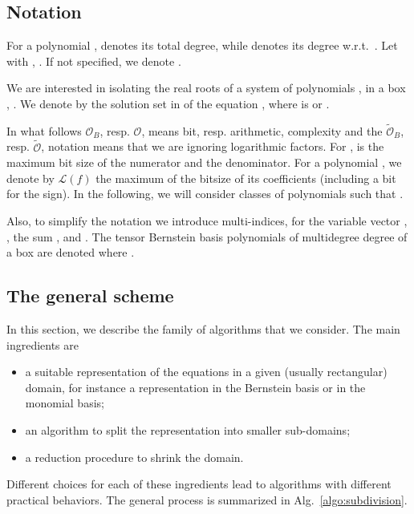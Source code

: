 \documentclass{sig-alternate}
\newcommand{\OO}{\ensuremath{\mathcal{O}}\xspace}
\newcommand{\sO}{\ensuremath{\widetilde{\mathcal{O}}}\xspace}
\newcommand{\OB}{\ensuremath{\mathcal{O}_B}\xspace}
\newcommand{\sOB}{\ensuremath{\widetilde{\mathcal{O}}_B}\xspace}
\newcommand{\bitsize}[1]{\ensuremath{\mathcal{L}\left( #1 \right)}\xspace}
\begin{document}
\subsection{Notation}

For a polynomial  ,  denotes its
total degree, while  denotes its degree w.r.t.~.
Let  with , . 
If not specified, we denote .

We are interested in isolating the real roots of a system of polynomials 
, in a
box , . 
We denote by  the solution
set in   of the equation , where  is  or .

In what follows \OB, resp. \OO, means bit, resp. arithmetic,
complexity and the \sOB, resp. \sO, notation means that we are
ignoring logarithmic factors.
For ,  is the maximum bit size of the
numerator and the denominator.  For a polynomial  , we denote by \bitsize{f} the maximum of the bitsize of
its coefficients (including a bit for the sign).  In the following, we
will consider classes of polynomials such that .



Also, to simplify the notation we introduce multi-indices, for the
variable vector , , the sum , and .
The tensor Bernstein basis polynomials of multidegree degree 
of a box  are denoted   where
.


\subsection{The general scheme}   

In this section, we describe the family of algorithms that we consider.
The main ingredients are 
\begin{itemize}
 \item  a suitable representation of the equations in a given (usually
rectangular) domain, for instance a representation in the Bernstein
basis or in the monomial basis;
 \item an algorithm to split the
representation into smaller sub-domains;
 \item a reduction procedure to
shrink the domain.
\end{itemize}
Different choices for each of these ingredients lead to algorithms
with different practical behaviors. The general process is summarized
in Alg.~\ref{algo:subdivision}.
\end{document}
